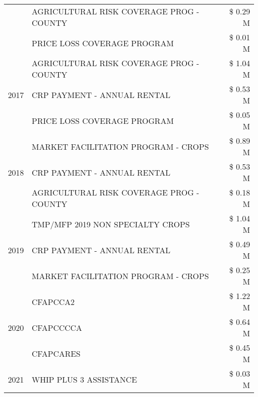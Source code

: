 \begin{tabular}{llr}
 & AGRICULTURAL RISK COVERAGE PROG - COUNTY & \$ 0.29 M \\
 & PRICE LOSS COVERAGE PROGRAM & \$ 0.01 M \\
\cline{1-3}
\multirow[t]{3}{*}{2017} & AGRICULTURAL RISK COVERAGE PROG - COUNTY & \$ 1.04 M \\
 & CRP PAYMENT - ANNUAL RENTAL & \$ 0.53 M \\
 & PRICE LOSS COVERAGE PROGRAM & \$ 0.05 M \\
\cline{1-3}
\multirow[t]{3}{*}{2018} & MARKET FACILITATION PROGRAM - CROPS & \$ 0.89 M \\
 & CRP PAYMENT - ANNUAL RENTAL & \$ 0.53 M \\
 & AGRICULTURAL RISK COVERAGE PROG - COUNTY & \$ 0.18 M \\
\cline{1-3}
\multirow[t]{3}{*}{2019} & TMP/MFP 2019 NON SPECIALTY CROPS & \$ 1.04 M \\
 & CRP PAYMENT - ANNUAL RENTAL & \$ 0.49 M \\
 & MARKET FACILITATION PROGRAM - CROPS & \$ 0.25 M \\
\cline{1-3}
\multirow[t]{3}{*}{2020} & CFAPCCA2 & \$ 1.22 M \\
 & CFAPCCCCA & \$ 0.64 M \\
 & CFAPCARES & \$ 0.45 M \\
\cline{1-3}
2021 & WHIP PLUS 3 ASSISTANCE & \$ 0.03 M \\
\cline{1-3}
\bottomrule
\end{tabular}

